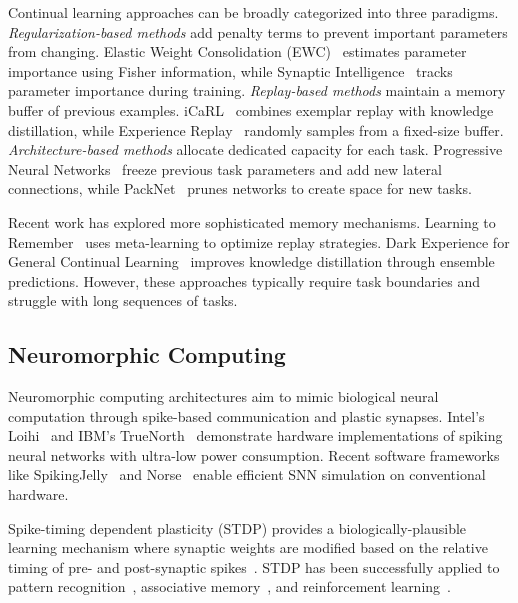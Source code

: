 \documentclass{article}
\begin{document}
Continual learning approaches can be broadly categorized into three paradigms. \emph{Regularization-based methods} add penalty terms to prevent important parameters from changing. Elastic Weight Consolidation (EWC)~\cite{kirkpatrick2017overcoming} estimates parameter importance using Fisher information, while Synaptic Intelligence~\cite{zenke2017continual} tracks parameter importance during training. \emph{Replay-based methods} maintain a memory buffer of previous examples. iCaRL~\cite{rebuffi2017icarl} combines exemplar replay with knowledge distillation, while Experience Replay~\cite{rolnick2019experience} randomly samples from a fixed-size buffer. \emph{Architecture-based methods} allocate dedicated capacity for each task. Progressive Neural Networks~\cite{rusu2016progressive} freeze previous task parameters and add new lateral connections, while PackNet~\cite{mallya2018packnet} prunes networks to create space for new tasks.

Recent work has explored more sophisticated memory mechanisms. Learning to Remember~\cite{rao2019continual} uses meta-learning to optimize replay strategies. Dark Experience for General Continual Learning~\cite{buzzega2020dark} improves knowledge distillation through ensemble predictions. However, these approaches typically require task boundaries and struggle with long sequences of tasks.

\subsection{Neuromorphic Computing}

Neuromorphic computing architectures aim to mimic biological neural computation through spike-based communication and plastic synapses. Intel's Loihi~\cite{davies2018loihi} and IBM's TrueNorth~\cite{akopyan2015truenorth} demonstrate hardware implementations of spiking neural networks with ultra-low power consumption. Recent software frameworks like SpikingJelly~\cite{fang2023spikingjelly} and Norse~\cite{pehle2021norse} enable efficient SNN simulation on conventional hardware.

Spike-timing dependent plasticity (STDP) provides a biologically-plausible learning mechanism where synaptic weights are modified based on the relative timing of pre- and post-synaptic spikes~\cite{markram1997regulation}. STDP has been successfully applied to pattern recognition~\cite{diehl2015unsupervised}, associative memory~\cite{querlioz2013bioinspired}, and reinforcement learning~\cite{froemke2010spike}.
\end{document}

